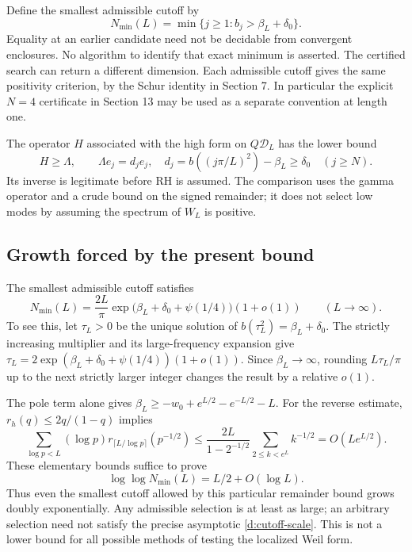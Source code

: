 Define the smallest admissible cutoff by
\[
N_{\min}(L)=\min\{j\ge1:b_j>\beta_L+\delta_0\}.
\]
Equality at an earlier candidate need not be decidable from convergent enclosures.
No algorithm to identify that exact minimum is asserted.
The certified search can return a different dimension. Each admissible
cutoff gives the same positivity criterion, by the Schur identity in Section 7.
In particular the explicit $N=4$ certificate in Section 13 may be used
as a separate convention at length one.

The operator $H$ associated with the high form on $Q\mathcal D_L$ has
the lower bound
\[
H\ge\Lambda,\qquad\Lambda e_j=d_je_j,\quad
d_j=b((j\pi/L)^2)-\beta_L\ge\delta_0\quad(j\ge N).
\]
Its inverse is legitimate before RH is assumed. The comparison uses the
gamma operator and a crude bound on the signed remainder; it does not
select low modes by assuming the spectrum of $W_L$ is positive.

\subsection{Growth forced by the present bound}\label{d:cutoff-growth}
The smallest admissible cutoff satisfies
\begin{equation}\label{d:cutoff-scale}
N_{\min}(L)=\frac{2L}{\pi}
\exp\bigl(\beta_L+\delta_0+\psi(1/4)\bigr)(1+o(1))
\qquad(L\to\infty).
\end{equation}
To see this, let $\tau_L>0$ be the unique solution of
$b(\tau_L^2)=\beta_L+\delta_0$. The strictly increasing multiplier and
its large-frequency expansion give
$\tau_L=2\exp(\beta_L+\delta_0+\psi(1/4))(1+o(1))$.
Since $\beta_L\to\infty$, rounding $L\tau_L/\pi$ up to the next strictly
larger integer changes the result by a relative $o(1)$.

The pole term alone gives
$\beta_L\ge-w_0+e^{L/2}-e^{-L/2}-L$.
For the reverse estimate, $r_h(q)\le2q/(1-q)$ implies
\[
\sum_{\log p<L}(\log p)r_{\lceil L/\log p\rceil}(p^{-1/2})
\le\frac{2L}{1-2^{-1/2}}\sum_{2\le k<e^L}k^{-1/2}
=O(Le^{L/2}).
\]
These elementary bounds suffice to prove
\begin{equation}\label{d:double-exponential}
\log\log N_{\min}(L)=L/2+O(\log L).
\end{equation}
Thus even the smallest cutoff allowed by this particular remainder bound
grows doubly exponentially. Any admissible selection is at least as large;
an arbitrary selection need not satisfy the precise asymptotic
\eqref{d:cutoff-scale}. This is not a lower bound for all possible methods
of testing the localized Weil form.

